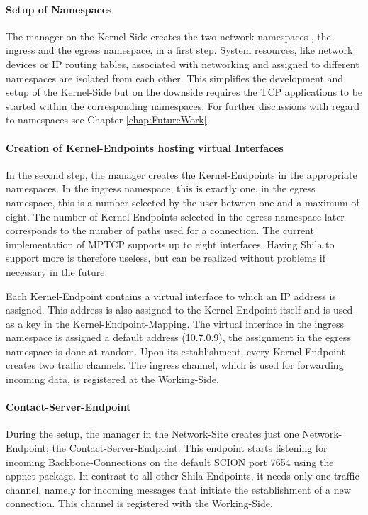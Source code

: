 \paragraph{Setup of Namespaces}

The manager on the Kernel-Side creates the two network namespaces \cite{LinuxNetworkNamespacesUbuntuManual,LinuxNetworkNamespacesIntroduction}, the ingress and the egress namespace, in a first step. System resources, like network devices or IP routing tables, associated with networking and assigned to different namespaces are isolated from each other. This simplifies the development and setup of the Kernel-Side but on the downside requires the TCP applications to be started within the corresponding namespaces. For further discussions with regard to namespaces see Chapter \ref{chap:FutureWork}.

\paragraph{Creation of Kernel-Endpoints hosting virtual Interfaces}

In the second step, the manager creates the Kernel-Endpoints in the appropriate namespaces. In the ingress namespace, this is exactly one, in the egress namespace, this is a number selected by the user between one and a maximum of eight. The number of Kernel-Endpoints selected in the egress namespace later corresponds to the number of paths used for a connection. The current implementation of MPTCP supports up to eight interfaces. Having Shila to support more is therefore useless, but can be realized without problems if necessary in the future.

Each Kernel-Endpoint contains a virtual interface to which an IP address is assigned. This address is also assigned to the Kernel-Endpoint itself and is used as a key in the Kernel-Endpoint-Mapping. The virtual interface in the ingress namespace is assigned a default address (10.7.0.9), the assignment in the egress namespace is done at random. Upon its establishment, every Kernel-Endpoint creates two traffic channels. The ingress channel, which is used for forwarding incoming data, is registered at the Working-Side. 

\paragraph{Contact-Server-Endpoint}

During the setup, the manager in the Network-Site creates just one Network-Endpoint; the Contact-Server-Endpoint. This endpoint starts listening for incoming Backbone-Connections on the default SCION port 7654 using the appnet package. In contrast to all other Shila-Endpoints, it needs only one traffic channel, namely for incoming messages that initiate the establishment of a new connection. This channel is registered with the Working-Side.

